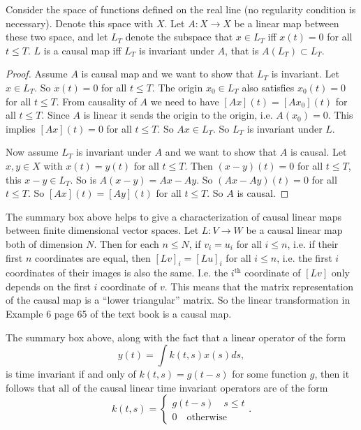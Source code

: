 \begin{summary}
	Consider the space of functions defined on the real line (no regularity condition is necessary). Denote this space with $ X $. Let $ A:X\to X $ be a linear map between these two space, and let $ L_T $ denote the subspace that $ x\in L_T $ iff $ x(t) = 0 $ for all $ t\leq T $. $ L $ is a causal map iff $ L_T $ is invariant under $ A $, that is $ A(L_T) \subset L_T $.
	
	\begin{proof}
		Assume $ A $ is causal map and we want to show that $ L_T $ is invariant. Let $ x\in L_T $. So $ x(t) = 0 $ for all $ t\leq T $. The origin $ x_0 \in L_T $ also satisfies $ x_0(t)=0 $ for all $ t\leq T $. From causality of $ A $ we need to have $ [Ax](t) = [Ax_0](t) $ for all $ t\leq T $. Since $ A $ is linear it sends the origin to the origin, i.e. $ A(x_0) =0 $. This implies $ [Ax](t) =0 $ for all $ t\leq T $. So $ Ax \in L_T $. So $ L_T $ is invariant under $ L $.
		
		Now assume $ L_T $ is invariant under $ A $ and we want to show that $ A $ is causal. Let $ x,y\in X $ with $ x(t) = y(t) $ for all $ t\leq T $. Then $ (x-y)(t) = 0 $ for all $ t\leq T $, this $ x-y\in L_T $. So is $ A(x-y) = Ax - Ay $. So $ (Ax-Ay)(t) = 0 $ for all $ t\leq T $. So $ [Ax](t) = [Ay](t) $ for all $ t\leq T $. So $ A $ is causal.
	\end{proof}
\end{summary}

\begin{summary}
	The summary box above helps to give a characterization of causal linear maps between finite dimensional vector spaces. Let $ L:V\to W $ be a causal linear map both of dimension $ N $. Then for each $ n\leq N $, if $ v_i = u_i $ for all $ i\leq n $, i.e. if their first $ n $ coordinates are equal, then $ [Lv]_i = [Lu]_i $ for all $ i\leq n $, i.e. the first $ i $ coordinates of their images is also the same. I.e. the $ i^\text{th} $ coordinate of $ [Lv] $ only depends on the first $ i $ coordinate of $ v $. This means that the matrix representation of the causal map is a ``lower triangular'' matrix. So the linear transformation in Example 6 page 65 of the text book is a causal map.
\end{summary}


\begin{summary}
	The summary box above, along with the fact that a linear operator of the form
	\[ y(t) = \int k(t,s) x(s) ds, \]
	is time invariant if and only of $ k(t,s) = g(t-s) $ for some function $ g $, then it follows that all of the causal linear time invariant operators are of the form
	\[ k(t,s) = \begin{cases}
		g(t-s) \quad s\leq t \\
		0 \quad \text{otherwise}
	\end{cases}. \]
\end{summary}



